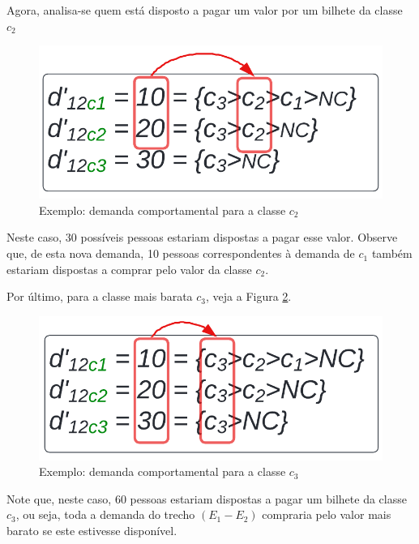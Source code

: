 Agora, analisa-se quem está disposto a pagar um valor por um bilhete da classe $c_2$
\begin{figure}[H]
	\begin{center}
		\includegraphics[scale=0.24]{img/dem_compo_c2.png}
		\caption{Exemplo: demanda comportamental para a classe $c_2$}
		\label{fig: exemplo_dem_c2}
	\end{center}
\end{figure}

Neste caso, 30 possíveis pessoas estariam dispostas a pagar esse valor. Observe que, de esta nova demanda, 10 pessoas correspondentes à demanda de $c_1$ também estariam dispostas a comprar pelo valor da classe $c_2$.

Por último, para a classe mais barata $c_3$, veja a Figura \ref{fig: exemplo_dem_c3}.
\begin{figure}[H]
	\begin{center}
		\includegraphics[scale=0.24]{img/dem_compo_c3.png}
		\caption{Exemplo: demanda comportamental para a classe $c_3$}
		\label{fig: exemplo_dem_c3}
	\end{center}
\end{figure}
Note que, neste caso, 60 pessoas estariam dispostas a pagar um bilhete da classe $c_3$, ou seja, toda a demanda do trecho $(E_1-E_2)$ compraria pelo valor mais barato se este estivesse disponível.

